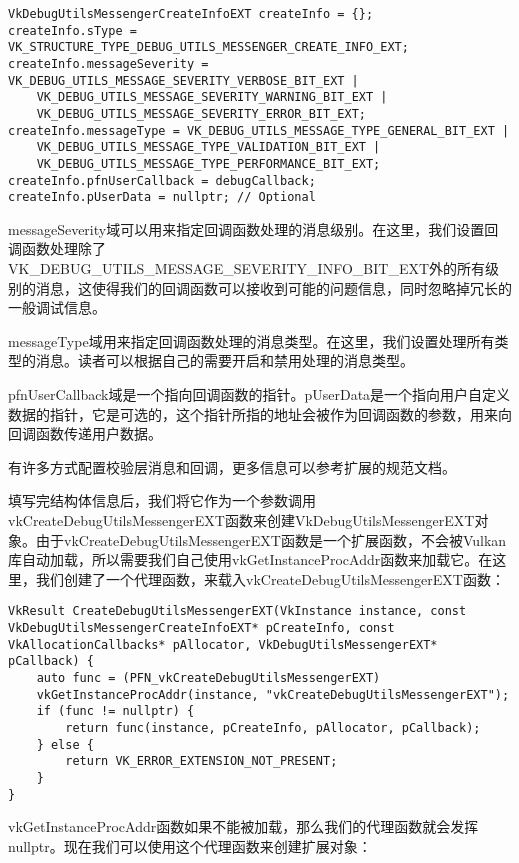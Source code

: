 \begin{lstlisting}[language={[ANSI]C}]
VkDebugUtilsMessengerCreateInfoEXT createInfo = {};
createInfo.sType = VK_STRUCTURE_TYPE_DEBUG_UTILS_MESSENGER_CREATE_INFO_EXT;
createInfo.messageSeverity = VK_DEBUG_UTILS_MESSAGE_SEVERITY_VERBOSE_BIT_EXT |
	VK_DEBUG_UTILS_MESSAGE_SEVERITY_WARNING_BIT_EXT |
	VK_DEBUG_UTILS_MESSAGE_SEVERITY_ERROR_BIT_EXT;
createInfo.messageType = VK_DEBUG_UTILS_MESSAGE_TYPE_GENERAL_BIT_EXT |
	VK_DEBUG_UTILS_MESSAGE_TYPE_VALIDATION_BIT_EXT |
	VK_DEBUG_UTILS_MESSAGE_TYPE_PERFORMANCE_BIT_EXT;
createInfo.pfnUserCallback = debugCallback;
createInfo.pUserData = nullptr; // Optional
\end{lstlisting}

messageSeverity域可以用来指定回调函数处理的消息级别。在这里，我们设置回调函数处理除了VK\_DEBUG\_UTILS\_MESSAGE\_SEVERITY\_INFO\_BIT\_EXT外的所有级别的消息，这使得我们的回调函数可以接收到可能的问题信息，同时忽略掉冗长的一般调试信息。

messageType域用来指定回调函数处理的消息类型。在这里，我们设置处理所有类型的消息。读者可以根据自己的需要开启和禁用处理的消息类型。

pfnUserCallback域是一个指向回调函数的指针。pUserData是一个指向用户自定义数据的指针，它是可选的，这个指针所指的地址会被作为回调函数的参数，用来向回调函数传递用户数据。

有许多方式配置校验层消息和回调，更多信息可以参考扩展的规范文档。

填写完结构体信息后，我们将它作为一个参数调用vkCreateDebugUtilsMessengerEXT函数来创建VkDebugUtilsMessengerEXT对象。由于vkCreateDebugUtilsMessengerEXT函数是一个扩展函数，不会被Vulkan库自动加载，所以需要我们自己使用vkGetInstanceProcAddr函数来加载它。在这里，我们创建了一个代理函数，来载入vkCreateDebugUtilsMessengerEXT函数：

\begin{lstlisting}[language={[ANSI]C}]
VkResult CreateDebugUtilsMessengerEXT(VkInstance instance, const VkDebugUtilsMessengerCreateInfoEXT* pCreateInfo, const VkAllocationCallbacks* pAllocator, VkDebugUtilsMessengerEXT* pCallback) {
	auto func = (PFN_vkCreateDebugUtilsMessengerEXT)
	vkGetInstanceProcAddr(instance, "vkCreateDebugUtilsMessengerEXT");
	if (func != nullptr) {
		return func(instance, pCreateInfo, pAllocator, pCallback);
	} else {
		return VK_ERROR_EXTENSION_NOT_PRESENT;
	}
}
\end{lstlisting}

vkGetInstanceProcAddr函数如果不能被加载，那么我们的代理函数就会发挥nullptr。现在我们可以使用这个代理函数来创建扩展对象：

